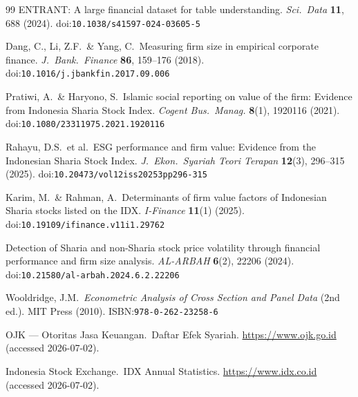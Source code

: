 \documentclass[11pt,a4paper]{article}
\begin{document}
\begin{thebibliography}{99}
ENTRANT: A large financial dataset for table understanding.
\textit{Sci.\ Data} \textbf{11}, 688 (2024).
doi:\texttt{10.1038/s41597-024-03605-5}

Dang, C., Li, Z.F.\ \& Yang, C.\ Measuring firm size in empirical corporate finance.
\textit{J.\ Bank.\ Finance} \textbf{86}, 159--176 (2018).
doi:\texttt{10.1016/j.jbankfin.2017.09.006}

Pratiwi, A.\ \& Haryono, S.\ Islamic social reporting on value of the firm: Evidence from Indonesia Sharia Stock Index.
\textit{Cogent Bus.\ Manag.} \textbf{8}(1), 1920116 (2021).
doi:\texttt{10.1080/23311975.2021.1920116}

Rahayu, D.S.\ et al.\ ESG performance and firm value: Evidence from the Indonesian Sharia Stock Index.
\textit{J.\ Ekon.\ Syariah Teori Terapan} \textbf{12}(3), 296--315 (2025).
doi:\texttt{10.20473/vol12iss20253pp296-315}

Karim, M.\ \& Rahman, A.\ Determinants of firm value factors of Indonesian Sharia stocks listed on the IDX.
\textit{I-Finance} \textbf{11}(1) (2025).
doi:\texttt{10.19109/ifinance.v11i1.29762}

Detection of Sharia and non-Sharia stock price volatility through financial performance and firm size analysis.
\textit{AL-ARBAH} \textbf{6}(2), 22206 (2024).
doi:\texttt{10.21580/al-arbah.2024.6.2.22206}

Wooldridge, J.M.\ \textit{Econometric Analysis of Cross Section and Panel Data} (2nd ed.). MIT Press (2010).
ISBN:\texttt{978-0-262-23258-6}

OJK --- Otoritas Jasa Keuangan.\ Daftar Efek Syariah.
\url{https://www.ojk.go.id} (accessed 2026-07-02).

Indonesia Stock Exchange.\ IDX Annual Statistics.
\url{https://www.idx.co.id} (accessed 2026-07-02).

\end{thebibliography}
\end{document}
